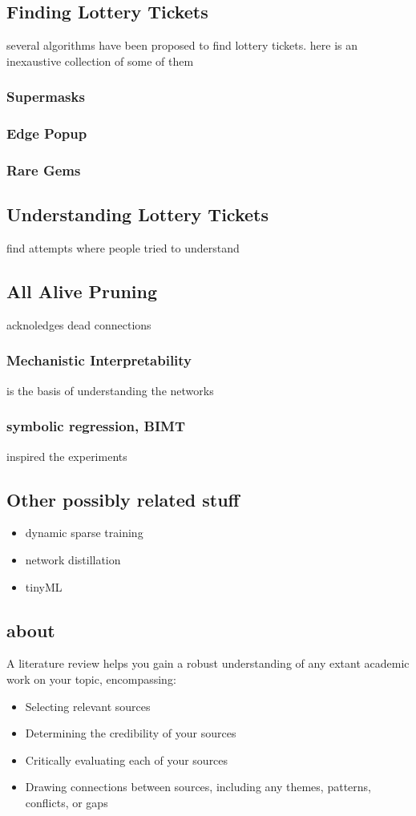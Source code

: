 \subsection{Finding Lottery Tickets}
several algorithms have been proposed to find lottery tickets. here is an inexaustive collection of some of them 
\subsubsection{Supermasks}
\subsubsection{Edge Popup}
\subsubsection{Rare Gems}

\subsection{Understanding Lottery Tickets}
find attempts where people tried to understand
\subsection{All Alive Pruning}
acknoledges dead connections
\subsubsection{Mechanistic Interpretability}
is the basis of understanding the networks
\subsubsection{symbolic regression, BIMT}
inspired the experiments




\subsection{Other possibly related stuff}
\begin{itemize}
    \item dynamic sparse training
    \item network distillation
    \item tinyML
\end{itemize}



\subsection{about}
A literature review helps you gain a robust understanding of any extant academic work on your topic, encompassing:
\begin{itemize}
    \item Selecting relevant sources
    \item Determining the credibility of your sources
    \item Critically evaluating each of your sources
    \item Drawing connections between sources, including any themes, patterns, conflicts, or gaps
  \end{itemize}



